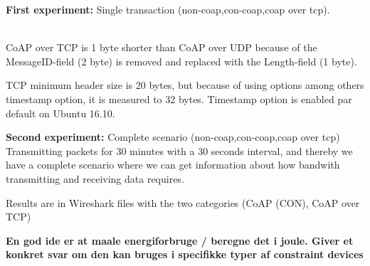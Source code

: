 \textbf{First experiment:} Single transaction (non-coap,con-coap,coap over tcp).
\\ \\

CoAP over TCP is 1 byte shorter than CoAP over UDP because of the MessageID-field (2 byte) is removed and replaced with the Length-field (1 byte).

TCP minimum header size is 20 bytes, but because of using options among others timestamp option, it is measured to 32 bytes. Timestamp option is enabled par default on Ubuntu 16.10.

\textbf{Second experiment:} Complete scenario (non-coap,con-coap,coap over tcp)
Transmitting packets for 30 minutes with a 30 seconds interval, and thereby we have a complete scenario where we can get information about how bandwith transmitting and receiving data requires.

Results are in Wireshark files with the two categories (CoAP (CON), CoAP over TCP)

\textbf{En god ide er at maale energiforbruge / beregne det i joule. Giver et konkret svar om den kan bruges i specifikke typer af constraint devices}

